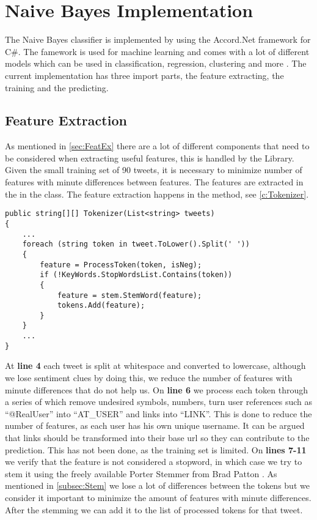 \section{Naive Bayes Implementation}\label{sec:NBImp}

The Naive Bayes classifier is implemented by using the Accord.Net framework for
C\#. The famework is used for machine learning and comes with a lot of different
models which can be used in classification, regression, clustering and more
\citep{Accord}. The current implementation has three import parts, the feature
extracting, the training and the predicting.

\subsection{Feature Extraction}
As mentioned in \autoref{sec:FeatEx} there are a lot of different components
that need to be considered when extracting useful features, this is handled by
the  Library.
Given the small training set of 90 tweets, it is necessary to minimize number of features with
minute differences between features. The features are extracted in the in the
 class. The feature extraction happens in the
 method, see \autoref{c:Tokenizer}.\nl

\begin{minipage}[H]{\linewidth}
\begin{lstlisting}[caption = Split and process each token in a tweet with
regexes and stemming, label = c:Tokenizer] 
public string[][] Tokenizer(List<string> tweets)
{
    ...
    foreach (string token in tweet.ToLower().Split(' '))
    {
        feature = ProcessToken(token, isNeg);
        if (!KeyWords.StopWordsList.Contains(token))
        {
        	feature = stem.StemWord(feature);
	        tokens.Add(feature);
    	}
	}
	...
}
\end{lstlisting}
\end{minipage}

At \textbf{line 4} each tweet is split at whitespace and converted to
lowercase, although we lose sentiment clues by doing this, we reduce the number
of features with minute differences that do not help us. On \textbf{line 6} we process each
token through a series of  which remove undesired symbols,
numbers, turn user references such as ``@RealUser'' into ``AT\_USER'' and links
into ``LINK''. This is done to reduce the number of features, as each user has
his own unique username. It can be argued that links should be transformed into
their base url so they can contribute to the prediction. This has not been
done, as the training set is limited. On \textbf{lines 7-11} we verify that the
feature is not considered a stopword, in which case we try to stem it using the
freely available Porter Stemmer from Brad Patton \citep{PorterStem}. As
mentioned in \autoref{subsec:Stem} we lose a lot of differences between the
tokens but we consider it important to minimize the amount of features with
minute differences. After the stemming we can add it to the list of processed
tokens for that tweet.

